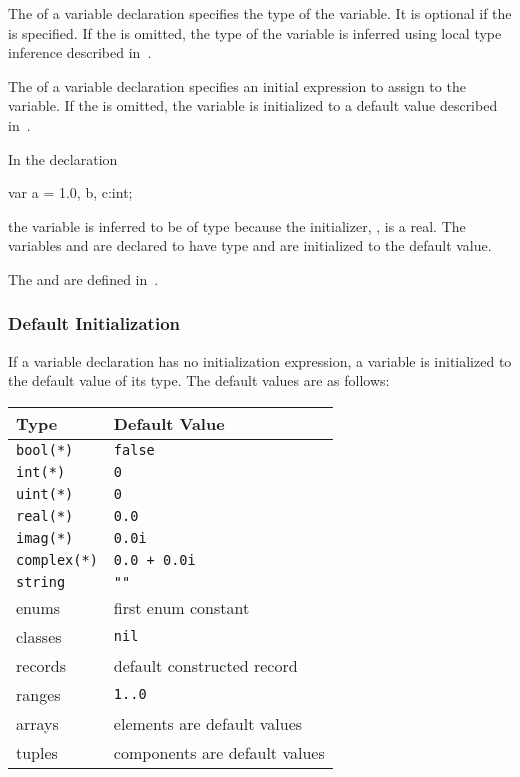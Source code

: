 The  of a variable declaration specifies the type of
the variable.  It is optional if the  is
specified.  If the  is omitted, the type of the
variable is inferred using local type inference described
in~.

The  of a variable declaration specifies an
initial expression to assign to the variable.  If
the  is omitted, the variable is initialized
to a default value described in~.

\begin{example}
In the declaration
\begin{chapel}
var a = 1.0, b, c:int;
\end{chapel}
the variable  is inferred to be of type  because the
initializer, , is a real.  The variables  and 
are declared to have type  and are initialized to the default
 value.
\end{example}

The 
and  are defined
in~.


\subsubsection{Default Initialization}
\label{Default_Initialization}

If a variable declaration has no initialization expression, a variable
is initialized to the default value of its type.  The default values
are as follows:
\begin{center}
\begin{tabular}{|l|l|}
\hline
{\bf Type} & {\bf Default Value} \\
\hline
{\tt bool(*)} & {\tt false} \\
{\tt int(*)} & {\tt 0} \\
{\tt uint(*)} & {\tt 0} \\
{\tt real(*)} & {\tt 0.0} \\
{\tt imag(*)} & {\tt 0.0i} \\
{\tt complex(*)} & {\tt 0.0 + 0.0i} \\
{\tt string} & {\tt ""} \\
enums & first enum constant \\
classes & {\tt nil} \\
records & default constructed record \\
ranges & {\tt 1..0} \\
arrays & elements are default values \\
tuples & components are default values \\
\hline
\end{tabular}
\end{center}

